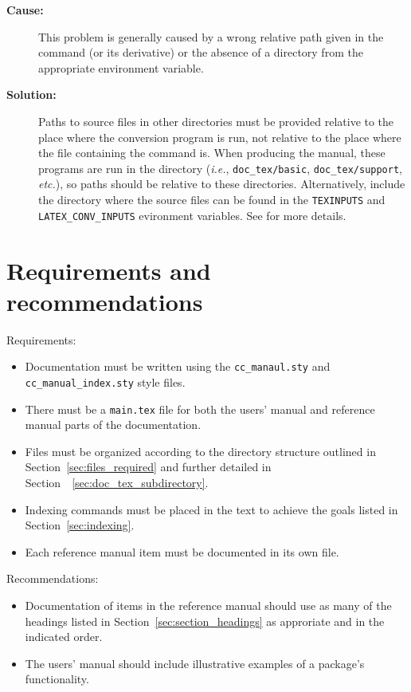 \begin{description}
\item[{\bf Cause:}] This problem is generally caused by a wrong relative path
given in the \verb|| command (or its derivative) or the absence of a 
directory from the appropriate environment variable.

\item[{\bf Solution:}] Paths to source files in other directories must be
provided relative to the place where the conversion program is run, not
relative to the place where the file containing the command is.  When producing
the manual, these programs are run in the  directory
({\em i.e.}, {\tt doc\_tex/basic}, {\tt doc\_tex/support}, {\em etc.}), so
paths should be relative to these directories.  Alternatively, include the 
directory where the source files can be found in the {\tt TEXINPUTS} and 
{\tt LATEX\_CONV\_INPUTS} evironment variables. See 
 for 
more details.
\end{description}

\section{Requirements and recommendations}
\label{sec:specification_req_and_rec}

\noindent
Requirements:
\begin{itemize}
   \item Documentation must be written using the {\tt cc\_manaul.sty}
         and {\tt cc\_manual\_index.sty} style files.
   \item There must be a {\tt main.tex} file for both the users' manual
         and reference manual parts of the documentation.
   \item Files must be organized according to the directory structure
         outlined in Section~\ref{sec:files_required} and further detailed
         in Section~~\ref{sec:doc_tex_subdirectory}.
   \item Indexing commands must be placed in the text to achieve the
         goals listed in Section~\ref{sec:indexing}.
   \item Each reference manual item must be documented in its own file.
\end{itemize}

\noindent
Recommendations:
\begin{itemize}
   \item Documentation of items in the reference manual should use as
         many of the headings listed in Section~\ref{sec:section_headings}
         as approriate and in the indicated order.
   \item The users' manual should include illustrative examples of a package's
         functionality.
\end{itemize}
